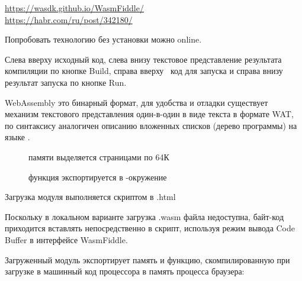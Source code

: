 
\noindent
\url{https://wasdk.github.io/WasmFiddle/}\\
\url{https://habr.com/ru/post/342180/}
\bigskip

Попробовать технологию без установки можно online.

\bigskip
{}

Слева вверху исходный код, слева внизу текстовое представление результата
компиляции по кнопке Build, справа вверху \js\ код для запуска и справа
внизу результат запуска по кнопке Run.

WebAssembly это бинарный формат, для удобства и отладки существует механизм
текстового представления один-в-один в виде текста в формате WAT, по синтаксису
аналогичен описанию вложенных списков (дерево программы) на языке \lisp.

\begin{description}
\item[] памяти выделяется страницами по 64К
\item[] функция экспортируется в
\js-окружение
\end{description}

Загрузка модуля выполняется скриптом в .html

Поскольку в локальном варианте загрузка .wasm файла недоступна, байт-код
приходится вставлять непосредственно в скрипт, используя режим вывода Code
Buffer в интерфейсе WasmFiddle.

Загруженный модуль экспортирует память и функцию, скомпилированную при загрузке
в машинный код процессора в память процесса браузера:\\

